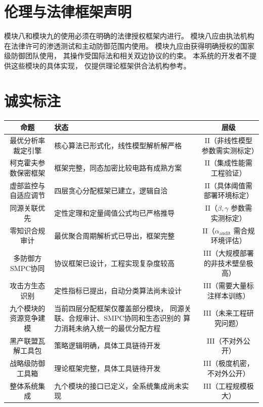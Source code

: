 \documentclass[11pt,a4paper]{article}
\begin{document}
\section{伦理与法律框架声明}

模块八和模块九的使用必须在明确的法律授权框架内进行。
模块八应由执法机构在法律许可的渗透测试和主动防御范围内使用。
模块九应由获得明确授权的国家级防御团队使用，
其操作受国际法和相关双边协议的约束。
本系统的开发者不提供这些模块的具体实现，
仅提供理论框架供合法机构参考。

\section{诚实标注}

\begin{center}
\begin{xltabular}{\textwidth}{c|X|c}
\toprule
\textbf{命题} & \textbf{状态} & \textbf{层级} \\
\midrule
最优分析率裁定引擎 &
核心算法已形式化，线性模型解析解严格 &
II（非线性模型参数需实测标定） \\
柯克霍夫参数保密框架 &
框架完整，同态加密比较电路有成熟方案 &
II（集成性能需工程验证） \\
虚部监控与自适应调节 &
四层贪心分配框架已建立，逻辑自洽 &
II（具体阈值需部署环境标定） \\
同源关联优先 &
定性定理和定量阈值公式均已严格推导 &
II（\(\beta, \gamma\) 参数需实测标定） \\
零知识合规审计 &
最优聚合周期解析式已导出，框架完整 &
II（\(\alpha_{\text{audit}}\) 需合规环境评估） \\
多防御方SMPC协同 &
协议框架已设计，工程实现复杂度较高 &
III（大规模部署的非技术壁垒极高） \\
攻击方生态识别 &
定性指标已提出，自动分类算法尚未设计 &
III（需要大量标注样本训练） \\
九个模块的资源竞争建模 &
当前四层分配框架仅覆盖部分模块，
同源关联、合规审计、SMPC协同和生态识别的
算力消耗未纳入统一的最优分配方程 &
III（未来工程研究问题） \\
黑产联盟瓦解工具包 &
策略逻辑明确，具体工具链待开发 &
III（不对外公开） \\
战略级防御工具箱 &
理论框架完整，具体工具链待开发 &
III（极度机密，不对外公开） \\
整体系统集成 &
九个模块的接口已定义，全系统集成尚未实现 &
III（工程规模极大） \\
\bottomrule
\end{xltabular}
\end{center}
\end{document}
